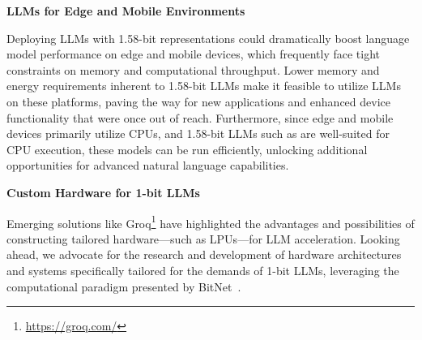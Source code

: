 \textbf{LLMs for Edge and Mobile Environments}

Deploying LLMs with 1.58-bit representations could dramatically boost language model performance on edge and mobile devices, which frequently face tight constraints on memory and computational throughput. Lower memory and energy requirements inherent to 1.58-bit LLMs make it feasible to utilize LLMs on these platforms, paving the way for new applications and enhanced device functionality that were once out of reach. Furthermore, since edge and mobile devices primarily utilize CPUs, and 1.58-bit LLMs such as  are well-suited for CPU execution, these models can be run efficiently, unlocking additional opportunities for advanced natural language capabilities.

\textbf{Custom Hardware for 1-bit LLMs}

Emerging solutions like Groq\footnote{\url{https://groq.com/}} have highlighted the advantages and possibilities of constructing tailored hardware—such as LPUs—for LLM acceleration. Looking ahead, we advocate for the research and development of hardware architectures and systems specifically tailored for the demands of 1-bit LLMs, leveraging the computational paradigm presented by BitNet~\cite{bitnet}.

